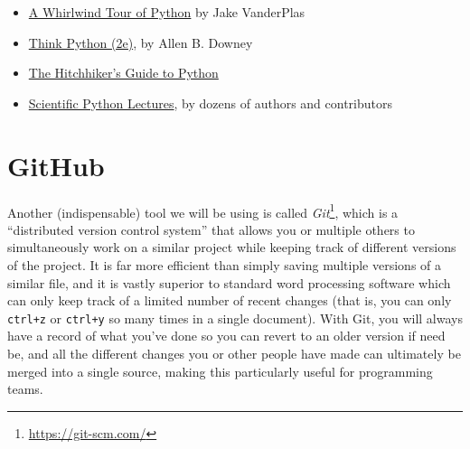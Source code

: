 \documentclass{tufte-book}
\begin{document}
\begin{itemize}
    \item \href{https://jakevdp.github.io/WhirlwindTourOfPython/}{A Whirlwind Tour of Python} by Jake VanderPlas
    \item \href{https://greenteapress.com/wp/think-python-2e/}{Think Python (2e)}, by Allen B. Downey
    \item \href{https://python-guide.readthedocs.io/en/latest/}{The Hitchhiker's Guide to Python}
    \item \href{https://lectures.scientific-python.org/}{Scientific Python Lectures}, by dozens of authors and contributors
\end{itemize}

\section{GitHub}\label{sec:github} %

{Another} (indispensable) tool we will be using is called \textit{Git}\footnote{\href{https://git-scm.com/}{https://git-scm.com/}}, which is a ``distributed version control system'' that allows you or multiple others to simultaneously work on a similar project while keeping track of different versions of the project. It is far more efficient than simply saving multiple versions of a similar file, and it is vastly superior to standard word processing software which can only keep track of a limited number of recent changes (that is, you can only \texttt{ctrl+z} or \texttt{ctrl+y} so many times in a single document). With Git, you will always have a record of what you've done so you can revert to an older version if need be, and all the different changes you or other people have made can ultimately be merged into a single source, making this particularly useful for programming teams.

\end{document}
